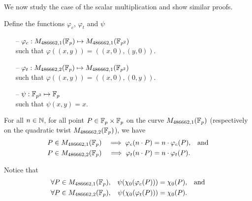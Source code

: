 We now study the case of the scalar multiplication and show similar proofs.
\begin{dfn}
  Define the functions $\varphi_c$, $\varphi_t$ and $\psi$
  \begin{itemize}
    \item[--] $\varphi_c: M_{486662,1}(\mathbb{F}_{p}) \mapsto M_{486662,1}(\mathbb{F}_{p^2})$\\
          such that $\varphi((x,y)) = ((x,0), (y,0))$.
    \item[--] $\varphi_t: M_{486662,2}(\mathbb{F}_{p}) \mapsto M_{486662,1}(\mathbb{F}_{p^2})$\\
          such that $\varphi((x,y)) = ((x,0), (0,y))$.
    \item[--] $\psi: \mathbb{F}_{p^2} \mapsto \mathbb{F}_{p}$\\
          such that $\psi(x,y) = x$.
  \end{itemize}
\end{dfn}

\begin{lemma}
  \label{lemma:proj}
  For all $n \in \mathbb{N}$, for all point $P\in\mathbb{F}_{p}\times\mathbb{F}_{p}$ on the curve
  $M_{486662,1}(\mathbb{F}_{p})$ (respectively on the quadratic twist $M_{486662,2}(\mathbb{F}_{p})$), we have
  \begin{align*}
      P &\in M_{486662,1}(\mathbb{F}_{p}) & \implies \varphi_c(n \cdot P) &= n \cdot \varphi_c(P), &&\text{and} \\
      P &\in M_{486662,2}(\mathbb{F}_{p}) & \implies \varphi_t(n \cdot P) &= n \cdot \varphi_t(P).
  \end{align*}
\end{lemma}
Notice that
\begin{align*}
    \forall P \in M_{486662,1}(\mathbb{F}_{p}), &&\psi(\chi_0(\varphi_c(P))) &= \chi_0(P), &&\text{and} \\
    \forall P \in M_{486662,2}(\mathbb{F}_{p}), &&\psi(\chi_0(\varphi_t(P))) &= \chi_0(P).
\end{align*}

